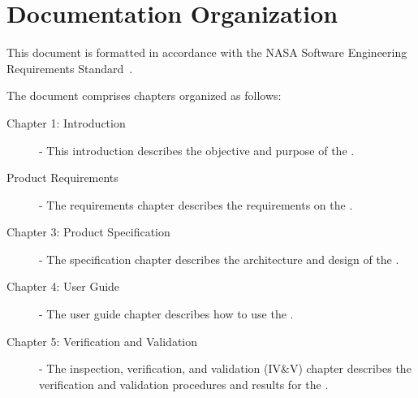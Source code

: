 \section{Documentation Organization}
\label{sec:docorg}
This document is formatted in accordance with the 
NASA Software Engineering Requirements Standard~\cite{NASA:SWE}.

The document comprises chapters organized as follows:

\begin{description}

\item[Chapter 1: Introduction] -
This introduction describes the objective and purpose of the \ModelDesc.

\item[Product Requirements] -
The requirements chapter describes the requirements on the \ModelDesc.

\item[Chapter 3: Product Specification] - 
The specification chapter describes
the architecture and design of the \ModelDesc.

\item[Chapter 4: User Guide] - 
The user guide chapter describes
how to use the \ModelDesc.

\item[Chapter 5: Verification and Validation] -  
The inspection, verification, and validation (IV\&V) chapter describes
the verification and validation procedures and results for the \ModelDesc.

\end{description}
